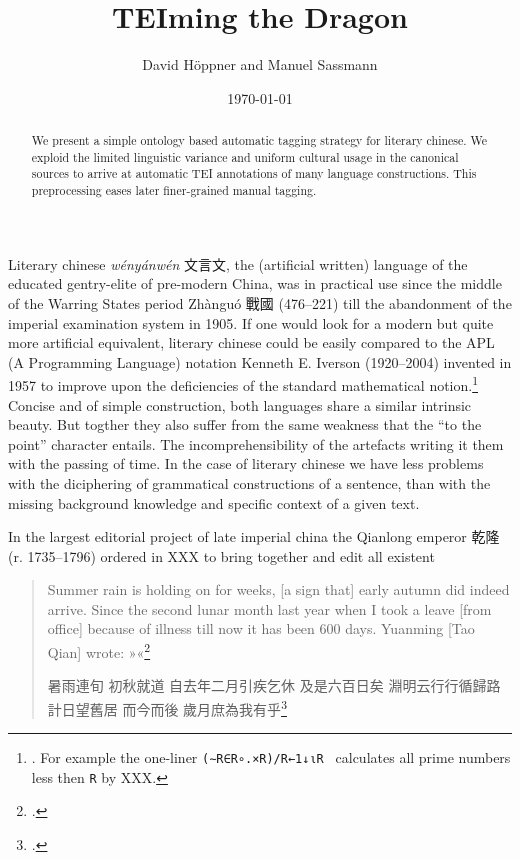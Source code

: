 \documentclass[12pt, draft]{article}
\begin{document}
\title{TEIming the Dragon}
\author{David Höppner and Manuel Sassmann}
\date{\today}
\maketitle

\begin{abstract}
	We present a simple ontology based automatic tagging strategy
	for
	literary chinese. We exploid the
	limited linguistic variance and uniform cultural usage
	in the canonical sources to arrive at
	automatic TEI annotations of many language constructions.
	This preprocessing eases later finer-grained manual tagging.
\end{abstract}

Literary chinese \emph{wényánwén} 文言文, 
the (artificial written) language of the educated gentry-elite
of pre-modern China, was in practical use since the middle of the Warring States
period Zhànguó 戰國 (476--221) till the
abandonment of the imperial examination system in 1905.
If one would look for a modern but quite more artificial equivalent,
literary chinese could be easily compared
to the APL (A Programming Language) notation Kenneth E. Iverson (1920--2004) invented
in 1957 to improve upon the deficiencies of the standard mathematical notion.\footnote{
	\cite{Iverson:1962}. For example the one-liner \texttt{(∼R∈R∘.×R)/R←1↓⍳R } calculates all prime numbers less then \texttt{R} by XXX.
}
Concise and of simple construction,
 both languages share a similar intrinsic beauty.
 But togther they also suffer from the same weakness that the ``to the point''
 character entails. The
 incomprehensibility of the artefacts writing it them with the passing of time.
In the case of literary chinese we have less problems with
the diciphering of grammatical constructions of a sentence,
than with the missing background knowledge and specific context
of a given text.


In the largest editorial project of late imperial china
the Qianlong emperor 乾隆 (r. 1735--1796) ordered in XXX
to bring together and edit all existent 

\begin{quote}
	Summer rain is holding on for weeks,
	[a sign that] early autumn did indeed arrive.
	Since the second lunar month last year
	when I took a leave [from office] because of illness
	till now it has been 600 days.
	Yuanming [Tao Qian] wrote:
	»«\footcite[XXX]{Hightower:1970}

	暑雨連旬
	初秋就道
	自去年二月引疾乞休
	及是六百日矣
	淵明云行行循歸路
	計日望舊居
	而今而後
	歲月庶為我有乎\footcite[1221]{JYTSJ}
\end{quote}
\end{document}
